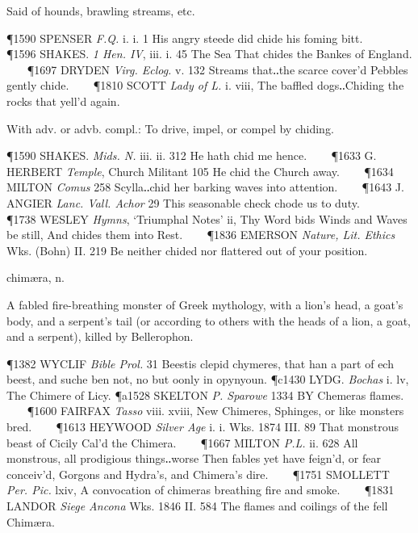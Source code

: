 \begin{description}[wide, labelwidth=!, labelindent=0pt]
\begin{myenumerate}
 Said of hounds, brawling streams, etc.

\P 1590 SPENSER  \textit{F.Q.} i. i. 1 His angry steede did chide his foming bitt.    
\P 1596 SHAKES.  \textit{1 Hen. IV}, iii. i. 45 The Sea That chides the Bankes of England.    
\P 1697 DRYDEN  \textit{Virg. Eclog.} v. 132 Streams that‥the scarce cover'd Pebbles gently chide.    
\P 1810 SCOTT  \textit{Lady of L.} i. viii, The baffled dogs‥Chiding the rocks that yell'd again.

 With adv. or advb. compl.: To drive, impel, or compel by chiding.

\P 1590 SHAKES.  \textit{Mids. N.} iii. ii. 312 He hath chid me hence.    
\P 1633 G. HERBERT  \textit{Temple}, Church Militant 105 He chid the Church away.    
\P 1634 MILTON  \textit{Comus} 258 Scylla‥chid her barking waves into attention.    
\P 1643 J. ANGIER  \textit{Lanc. Vall. Achor} 29 This seasonable check chode us to duty.    
\P 1738 WESLEY  \textit{Hymns}, ‘Triumphal Notes’ ii, Thy Word bids Winds and Waves be still, And chides them into Rest.    
\P 1836 EMERSON  \textit{Nature, Lit. Ethics} Wks. (Bohn) II. 219 Be neither chided nor flattered out of your position.
\end{myenumerate}


 chimæra, n.

\noindent {}

\vspace{-0.3cm}

\begin{myenumerate}

 A fabled fire-breathing monster of Greek mythology, with a lion's head, a goat's body, and a serpent's tail (or according to others with the heads of a lion, a goat, and a serpent), killed by Bellerophon.

\P 1382 WYCLIF  \textit{Bible Prol.} 31 Beestis clepid chymeres, that han a part of ech beest, and suche ben not, no but oonly in opynyoun.
\P c1430 LYDG.  \textit{Bochas} i. lv, The Chimere of Licy.
\P a1528 SKELTON \textit{P. Sparowe} 1334 BY Chemeras  flames.    
\P 1600 FAIRFAX  \textit{Tasso} viii. xviii, New Chimeres, Sphinges, or like monsters bred.    
\P 1613 HEYWOOD  \textit{Silver Age} i. i. Wks. 1874 III.  89 That monstrous beast of Cicily Cal'd the Chimera.    
\P 1667 MILTON  \textit{P.L.} ii. 628 All monstrous, all prodigious things‥worse Then fables yet have feign'd, or fear conceiv'd, Gorgons and Hydra's, and Chimera's dire.    
\P 1751 SMOLLETT  \textit{Per. Pic.} lxiv, A convocation of chimeras breathing fire and smoke.    
\P 1831 LANDOR  \textit{Siege Ancona} Wks. 1846 II. 584  The flames and coilings of the fell Chimæra.


\end{myenumerate}
\end{description}

